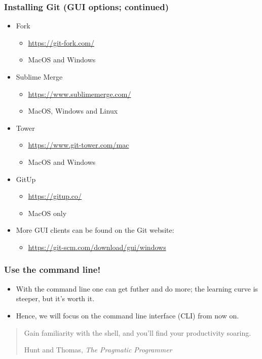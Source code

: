 \begin{frame}
\frametitle{Installing Git (GUI options; continued)}
\begin{itemize}
    \item Fork
        \begin{itemize}
            \item \url{https://git-fork.com/}
            \item MacOS and Windows
        \end{itemize}
    \item Sublime Merge
        \begin{itemize}
            \item \url{https://www.sublimemerge.com/}
            \item MacOS, Windows and Linux
        \end{itemize}
    \item Tower
        \begin{itemize}
            \item \url{https://www.git-tower.com/mac}
            \item MacOS and Windows
        \end{itemize}
    \item GitUp
        \begin{itemize}
            \item \url{https://gitup.co/}
            \item MacOS only
        \end{itemize}
    \item More GUI clients can be found on the Git website:
        \begin{itemize}
            \item \url{https://git-scm.com/download/gui/windows}
        \end{itemize}
\end{itemize}
\end{frame}


\begin{frame}
\frametitle{Use the command line!}
\begin{itemize}
    \item With the command line one can get futher and do more; the
        learning curve is steeper, but it's worth it.
    \item Hence, we will focus on the command line interface (CLI) from now
        on.
\end{itemize}
    \blockquote[Hunt and Thomas, \emph{The Pragmatic Programmer}]
    {Gain familiarity with the shell, and you'll find your productivity soaring.}
\end{frame}


